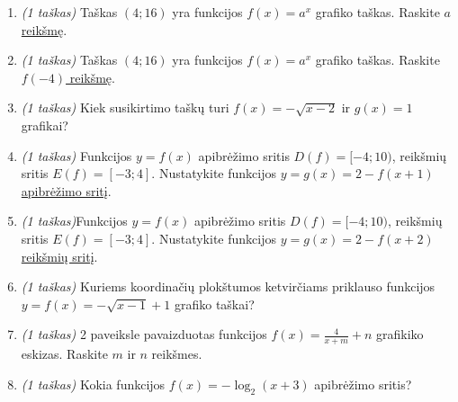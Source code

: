 \documentclass[a4paper]{article}
\begin{document}
\begin{enumerate}
      \item \textit{(1 taškas)} Taškas $(4; 16)$ yra funkcijos $f(x)=a^x$
            grafiko taškas. Raskite \underline{$a$ reikšmę}.
            \vspace{7mm}

      \item \textit{(1 taškas)} Taškas $(4; 16)$ yra funkcijos $f(x)=a^x$
            grafiko taškas. Raskite \underline{$f(-4)$ reikšmę}.
            \vspace{7mm}

      \item \textit{(1 taškas)} Kiek susikirtimo taškų turi $f(x)=-\sqrt{x-2}$
            ir
            $g(x)=1$ grafikai?
            \vspace{7mm}

      \item \textit{(1 taškas)} Funkcijos $y=f(x)$ apibrėžimo sritis $D(f)=[-4;
                  10)$, reikšmių sritis $E(f)=[-3;4]$. Nustatykite funkcijos
            $y=g(x)=2-f(x+1)$
            \underline{apibrėžimo sritį}.
            \vspace{7mm}

      \item \textit{(1 taškas)}Funkcijos $y=f(x)$ apibrėžimo sritis $D(f)=[-4;
                  10)$, reikšmių sritis $E(f)=[-3;4]$. Nustatykite funkcijos
            $y=g(x)=2-f(x+2)$
            \underline{reikšmių sritį}.
            \vspace{7mm}

      \item \textit{(1 taškas)} Kuriems koordinačių plokštumos ketvirčiams
            priklauso funkcijos $y=f(x)=-\sqrt{x-1}+1$ grafiko taškai?
            \vspace{7mm}

      \item \textit{(1 taškas)} 2 paveiksle pavaizduotas funkcijos
            $f(x)=\frac{4}{x+m}+n$ grafikiko eskizas. Raskite $m$ ir $n$
            reikšmes.
            \vspace{7mm}

      \item \textit{(1 taškas)} Kokia funkcijos $f(x)=-\log_2(x+3)$ apibrėžimo
            sritis?
            \vspace{10mm}

            \begin{figure}[!htpb]
                  \centering
                  \begin{minipage}[]{0.5\linewidth}
                        \centering


\end{minipage}
\end{figure}
\end{enumerate}
\end{document}
